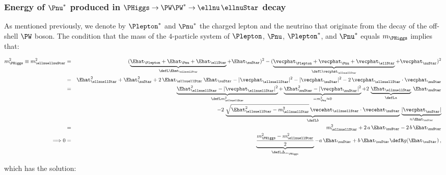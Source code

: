 \subsubsection{Energy of \texorpdfstring{$\Pnu^{\ast}$}{v*} produced in \texorpdfstring{$\PHiggs \to \PW\PW^{\ast} \to \ellnu \, \ellnuStar$}{H->WW*->lvl*v*} decay}
\label{sec:appendix_nuEn_Hww}

As mentioned previously, we denote by $\Plepton^{\ast}$ and $\Pnu^{\ast}$ the charged lepton and the neutrino that originate from the decay of the off-shell $\PW$ boson.
The condition that the mass of the $4$-particle system of $\Plepton$, $\Pnu$, $\Plepton^{\ast}$, and $\Pnu^{\ast}$ equals $m_{\PHiggs}$ implies that:
\begin{linenowrapper}
\begin{eqnarray}
m_{\PHiggs}^{2} \equiv m_{\ellnuellnuStar}^{2} 
 & = & ( \underbrace{\Ehat_{\Plepton} + \Ehat_{\Pnu} + \Ehat_{\ellStar}}_{\defL \Ehat_{\ellnuellStar}} + \Ehat_{\nuStar} )^{2} 
- ( \underbrace{\vecphat_{\Plepton} + \vecphat_{\Pnu} + \vecphat_{\ellStar}}_{\defL \vecphat_{\ellnuellStar}} + \vecphat_{\nuStar} )^{2} \nonumber \\
 & = & \Ehat_{\ellnuellStar}^{2} + \Ehat_{\nuStar}^{2} + 2 \, \Ehat_{\ellnuellStar} \, \Ehat_{\nuStar} 
- |\vecphat_{\ellnuellStar}|^{2} - |\vecphat_{\nuStar}|^{2} - 2 \, \vecphat_{\ellnuellStar} \cdot \vecphat_{\nuStar} \nonumber \\
 & = & \underbrace{\Ehat_{\ellnuellStar}^{2} - |\vecphat_{\ellnuellStar}|^{2}}_{\defL m_{\ellnuellStar}^{2}} 
+ \underbrace{\Ehat_{\nuStar}^{2} - |\vecphat_{\nuStar}|^{2}}_{= m_{\Pnu}^{2} \approx 0} 
+ 2 \, \underbrace{\Ehat_{\ellnuellStar}}_{\defL a} \, \Ehat_{\nuStar} \nonumber \\
 & & \quad - 2 \, \underbrace{\sqrt{\Ehat_{\ellnuellStar}^{2} - m_{\ellnuellStar}^{2}} \, \vecehat_{\ellnuellStar} \cdot \vecehat_{\nuStar}}_{\defL b} \, 
 \underbrace{|\vecphat_{\nuStar}|}_{\approx \Ehat_{\nuStar}} \nonumber \\
 & = & m_{\ellnuellStar}^{2} + 2 \, a \, \Ehat_{\nuStar} - 2 \, b \, \Ehat_{\nuStar} \nonumber \\
\Longrightarrow 0 & = & \underbrace{\frac{m_{\PHiggs}^{2} - m_{\ellnuellStar}^{2}}{2}}_{\defL \Delta_{m_{\PHiggs}}} - a \, \Ehat_{\nuStar} + b \, \Ehat_{\nuStar}
  \defR g(\Ehat_{\nuStar}) \, ,
\label{eq:nuEn_Hww1}
\end{eqnarray}
\end{linenowrapper}
which has the solution:
